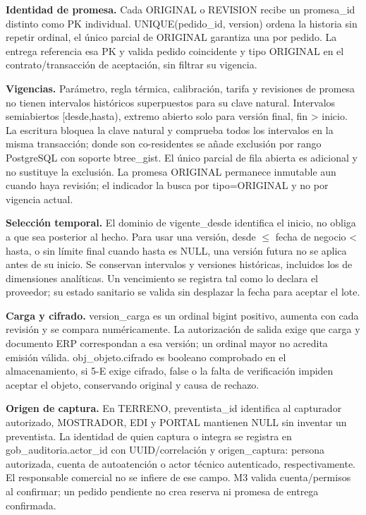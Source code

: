 \textbf{Identidad de promesa.} Cada ORIGINAL o REVISION recibe un promesa\_id distinto como PK individual. UNIQUE(pedido\_id, version) ordena la historia sin repetir ordinal, el único parcial de ORIGINAL garantiza una por pedido. La entrega referencia esa PK y valida pedido coincidente y tipo ORIGINAL en el contrato/transacción de aceptación, sin filtrar su vigencia.

\textbf{Vigencias.} Parámetro, regla térmica, calibración, tarifa y revisiones de promesa no tienen intervalos históricos superpuestos para su clave natural. Intervalos semiabiertos [desde,hasta), extremo abierto solo para versión final, fin > inicio. La escritura bloquea la clave natural y comprueba todos los intervalos en la misma transacción; donde son co-residentes se añade exclusión por rango PostgreSQL con soporte btree\_gist. El único parcial de fila abierta es adicional y no sustituye la exclusión. La promesa ORIGINAL permanece inmutable aun cuando haya revisión; el indicador la busca por tipo=ORIGINAL y no por vigencia actual.

\textbf{Selección temporal.} El dominio de vigente\_desde identifica el inicio, no obliga a que sea posterior al hecho. Para usar una versión, desde \ensuremath{\leq} fecha de negocio < hasta, o sin límite final cuando hasta es NULL, una versión futura no se aplica antes de su inicio. Se conservan intervalos y versiones históricas, incluidos los de dimensiones analíticas. Un vencimiento se registra tal como lo declara el proveedor; su estado sanitario se valida sin desplazar la fecha para aceptar el lote.

\textbf{Carga y cifrado.} version\_carga es un ordinal bigint positivo, aumenta con cada revisión y se compara numéricamente. La autorización de salida exige que carga y documento ERP correspondan a esa versión; un ordinal mayor no acredita emisión válida. obj\_objeto.cifrado es booleano comprobado en el almacenamiento, si 5-E exige cifrado, false o la falta de verificación impiden aceptar el objeto, conservando original y causa de rechazo.

\textbf{Origen de captura.} En TERRENO, preventista\_id identifica al capturador autorizado, MOSTRADOR, EDI y PORTAL mantienen NULL sin inventar un preventista. La identidad de quien captura o integra se registra en gob\_auditoria.actor\_id con UUID/correlación y origen\_captura: persona autorizada, cuenta de autoatención o actor técnico autenticado, respectivamente. El responsable comercial no se infiere de ese campo. M3 valida cuenta/permisos al confirmar; un pedido pendiente no crea reserva ni promesa de entrega confirmada.

